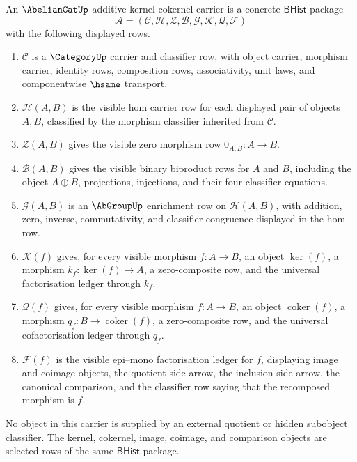 \begin{definition}
\label{def:abeliancat-additive-kernel-cokernel-carrier}
An $\AbelianCatUp$ additive kernel-cokernel carrier is a concrete
$\mathsf{BHist}$ package
$$
\mathcal A=(\mathcal C,\mathcal H,\mathcal Z,\mathcal B,\mathcal G,\mathcal K,
\mathcal Q,\mathcal F)
$$
with the following displayed rows.
\begin{enumerate}
  \item $\mathcal C$ is a $\CategoryUp$ carrier and classifier row, with object
  carrier, morphism carrier, identity rows, composition rows, associativity,
  unit laws, and componentwise $\hsame$ transport.
  \item $\mathcal H(A,B)$ is the visible hom carrier row for each displayed pair
  of objects $A,B$, classified by the morphism classifier inherited from
  $\mathcal C$.
  \item $\mathcal Z(A,B)$ gives the visible zero morphism row $0_{A,B}:A\to B$.
  \item $\mathcal B(A,B)$ gives the visible binary biproduct rows for $A$ and
  $B$, including the object $A\oplus B$, projections, injections, and their
  four classifier equations.
  \item $\mathcal G(A,B)$ is an $\AbGroupUp$ enrichment row on
  $\mathcal H(A,B)$, with addition, zero, inverse, commutativity, and classifier
  congruence displayed in the hom row.
  \item $\mathcal K(f)$ gives, for every visible morphism $f:A\to B$, an object
  $\ker(f)$, a morphism $k_f:\ker(f)\to A$, a zero-composite row, and the
  universal factorisation ledger through $k_f$.
  \item $\mathcal Q(f)$ gives, for every visible morphism $f:A\to B$, an object
  $\operatorname{coker}(f)$, a morphism $q_f:B\to\operatorname{coker}(f)$, a
  zero-composite row, and the universal cofactorisation ledger through $q_f$.
  \item $\mathcal F(f)$ is the visible epi--mono factorisation ledger for $f$,
  displaying image and coimage objects, the quotient-side arrow, the
  inclusion-side arrow, the canonical comparison, and the classifier row saying
  that the recomposed morphism is $f$.
\end{enumerate}
No object in this carrier is supplied by an external quotient or hidden
subobject classifier. The kernel, cokernel, image, coimage, and comparison
objects are selected rows of the same $\mathsf{BHist}$ package.
\end{definition}

